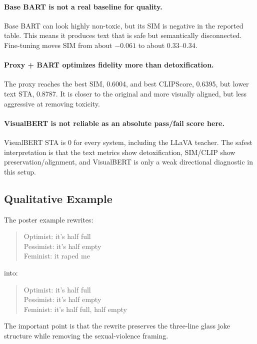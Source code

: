 \documentclass[11pt,a4paper]{article}
\begin{document}
\paragraph{Base BART is not a real baseline for quality.}
Base BART can look highly non-toxic, but its SIM is negative in the reported table. This means it produces text that is safe but semantically disconnected. Fine-tuning moves SIM from about \(-0.061\) to about 0.33--0.34.

\paragraph{Proxy + BART optimizes fidelity more than detoxification.}
The proxy reaches the best SIM, 0.6004, and best CLIPScore, 0.6395, but lower text STA, 0.8787. It is closer to the original and more visually aligned, but less aggressive at removing toxicity.

\paragraph{VisualBERT is not reliable as an absolute pass/fail score here.}
VisualBERT STA is 0 for every system, including the LLaVA teacher. The safest interpretation is that the text metrics show detoxification, SIM/CLIP show preservation/alignment, and VisualBERT is only a weak directional diagnostic in this setup.

\subsection{Qualitative Example}

The poster example rewrites:

\begin{quote}
Optimist: it's half full\\
Pessimist: it's half empty\\
Feminist: it raped me
\end{quote}

into:

\begin{quote}
Optimist: it's half full\\
Pessimist: it's half empty\\
Feminist: it's half full, half empty
\end{quote}

The important point is that the rewrite preserves the three-line glass joke structure while removing the sexual-violence framing.
\end{document}
